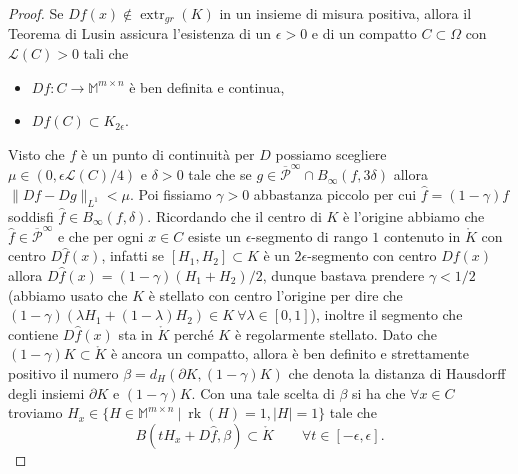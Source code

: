 \documentclass[a4paper,11pt]{book}
\theoremstyle{plain}
\theoremstyle{definition}
\theoremstyle{remark}
\newcommand{\M}{\mathbb{M}}
\newcommand{\LL}{\mathscr{L}}
\newcommand{\norm}[1]{\lVert#1\rVert}
\DeclareMathOperator{\rk}{rk}
\DeclareMathOperator{\extr}{extr}
\newcommand{\boh}{\textcolor{red}{\Huge\textbf{???}}}
\newcommand{\attenzione}{\textcolor{red}{\Huge\textbf{!!!}}}
\begin{document}
\begin{proof}
	Se $Df(x)\not\in \extr_{gr}(K)$ in un insieme di misura positiva, allora il Teorema di Lusin assicura l'esistenza di un $\epsilon >0$ e di un compatto $C\subset \Omega$ con $\LL(C)>0$ tali che
	\begin{itemize}
		\item $Df:C\to\M^{m\times n}$ è ben definita e continua,
		\item $Df(C)\subset K_{2\epsilon}$.
	\end{itemize}
	Visto che $f$ è un punto di continuità per $D$ possiamo scegliere $\mu\in(0,\epsilon\LL(C)/4)$ e $\delta>0$ tale che se $g\in \overline{\mathscr{P}}^{\infty}\cap B_{\infty}(f,3\delta)$ allora $\norm{Df-Dg}_{L^{1}}<\mu$. Poi fissiamo $\gamma>0$ abbastanza piccolo per cui $\hat{f}=(1-\gamma)f$ soddisfi $\hat{f}\in B_{\infty}(f,\delta)$. Ricordando che il centro di $K$ è l'origine abbiamo che $\hat{f}\in\overline{\mathscr{P}}^{\infty}$ e che per ogni $x\in C$ esiste un $\epsilon$-segmento di rango $1$ contenuto in $\mathring{K}$ con centro $D\hat{f}(x)$, infatti se $[H_{1},H_{2}]\subset K$ è un $2\epsilon$-segmento con centro $Df(x)$ allora $D\hat{f}(x)=(1-\gamma)(H_{1}+H_{2})/2$, dunque bastava prendere $\gamma<1/2$ (abbiamo usato che $K$ è stellato con centro l'origine per dire che $(1-\gamma)(\lambda H_{1}+(1-\lambda)H_{2})\in K\ \forall \lambda\in[0,1]$), inoltre il segmento che contiene $D\hat{f}(x)$ sta in $\mathring{K}$ perché $K$ è regolarmente stellato. Dato che $(1-\gamma)K\subset \mathring{K}$ è ancora un compatto, allora è ben definito e strettamente positivo il numero $\beta=d_{H}(\partial K, (1-\gamma)K)$ che denota la distanza di Hausdorff degli insiemi $\partial K$ e $(1-\gamma)K$. Con una tale scelta di $\beta$ si ha che $\forall x\in C$ troviamo $H_{x}\in \{H\in \M^{m\times n}\ |\ \rk(H)=1, |H|=1\}$ tale che
	\begin{equation}\label{eq:5}
		B(tH_{x}+D\hat{f},\beta)\subset \mathring{K}\qquad \forall t\in[-\epsilon,\epsilon].
	\end{equation}
	\begin{comment}
	Dato che $[H_{1},H_{2}]\subset \mathring{K}$ è compatto esiste anche un $\beta>0$ tale che
	\begin{equation}\label{eq:5}
		B(tH_{1}+(1-t)H_{2},\beta)\subset \mathring{K}\qquad\forall t\in [0,1].
	\end{equation}
	\attenzione da sistemare\\
	\end{comment}
	\begin{comment}
	\boh A cosa serve?
	Dato che $D\hat{f}:C\to K$ è continua, un semplice argomento di compattezza mostra anche che c'è un $\beta>0$ tale che per ogni $x\in C$ troviamo $H_{x}\in\M^{m\times n}$ tale che
	\[
		\rk(H_{x})=1,\quad|H_{x}|=1,\quad B(tH_{x}+D\hat{f}(x),\beta)\subset \mathring{K}\qquad\text{se }t\in[-\epsilon,\epsilon].
	\]
	\boh{}
	\end{comment}
	

\end{proof}
\end{document}
